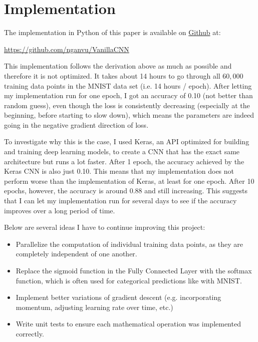 \documentclass[12pt]{article}
\begin{document}
\section{Implementation}
The implementation in Python of this paper is available on \href{https://github.com/nganvu/VanillaCNN}{Github} at:
\begin{center}
    \url{https://github.com/nganvu/VanillaCNN}
\end{center}

This implementation follows the derivation above as much as possible and therefore it is not optimized. It takes about 14 hours to go through all $60,000$ training data points in the MNIST data set (i.e. 14 hours / epoch). After letting my implementation run for one epoch, I got an accuracy of 0.10 (not better than random guess), even though the loss is consistently decreasing (especially at the beginning, before starting to slow down), which means the parameters are indeed going in the negative gradient direction of loss.

To investigate why this is the case, I used Keras, an API optimized for building and training deep learning models, to create a CNN that has the exact same architecture but runs a lot faster. After 1 epoch, the accuracy achieved by the Keras CNN is also just 0.10. This means that my implementation does not perform worse than the implementation of Keras, at least for one epoch. After 10 epochs, however, the accuracy is around 0.88 and still increasing. This suggests that I can let my implementation run for several days to see if the accuracy improves over a long period of time.

Below are several ideas I have to continue improving this project:
\begin{itemize}
    \item Parallelize the computation of individual training data points, as they are completely independent of one another.
    \item Replace the sigmoid function in the Fully Connected Layer with the softmax function, which is often used for categorical predictions like with MNIST.
    \item Implement better variations of gradient descent (e.g. incorporating momentum, adjusting learning rate over time, etc.)
    \item Write unit tests to ensure each mathematical operation was implemented correctly.
\end{itemize}
\end{document}
